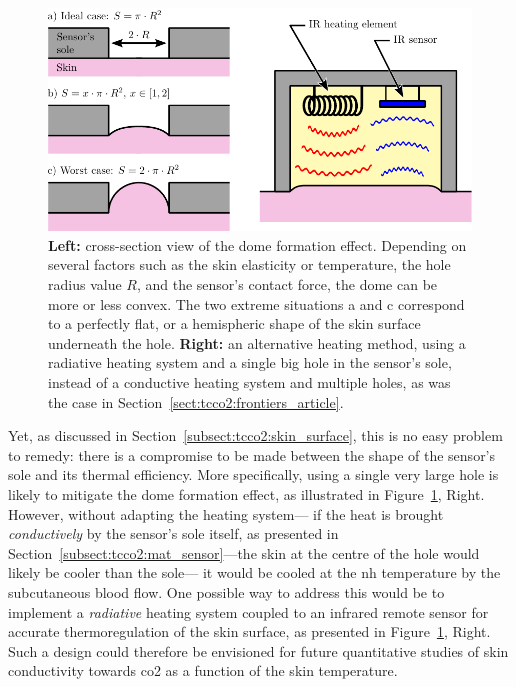 \begin{figure}
	\centering
	\includegraphics{1_main_matter/conclusion_figures/sole_dome_converted.pdf}
	\caption[Influence of skin elasticity on dome formation, and alternative heating scheme.]{\textbf{Left:} cross-section view of the dome formation effect. Depending on several factors such as the skin elasticity or temperature, the hole radius value $R$, and the sensor's contact force, the dome can be more or less convex. The two extreme situations a and c correspond to a perfectly flat, or a hemispheric shape of the skin surface underneath the hole. \textbf{Right:} an alternative heating method, using a radiative heating system and a single big hole in the sensor's sole, instead of a conductive heating system and multiple holes, as was the case in Section~\ref{sect:tcco2:frontiers_article}.}
	\label{fig:conclusion:sole_shape}
\end{figure}

Yet, as discussed in Section~\ref{subsect:tcco2:skin_surface}, this is no easy problem to remedy: there is a compromise to be made between the shape of the sensor's sole and its thermal efficiency. More specifically, using a single very large hole is likely to mitigate the dome formation effect, as illustrated in Figure~\ref{fig:conclusion:sole_shape}, Right. However, without adapting the heating system---\ie{} if the heat is brought \emph{conductively} by the sensor's sole itself, as presented in Section~\ref{subsect:tcco2:mat_sensor}---the skin at the centre of the hole would likely be cooler than the sole---\ie{} it would be cooled at the \gls{nh} temperature by the subcutaneous blood flow. One possible way to address this would be to implement a \emph{radiative} heating system coupled to an infrared remote sensor for accurate thermoregulation of the skin surface, as presented in Figure~\ref{fig:conclusion:sole_shape}, Right. Such a design could therefore be envisioned for future quantitative studies of skin conductivity towards \eg{} \gls{co2} as a function of the skin temperature.

